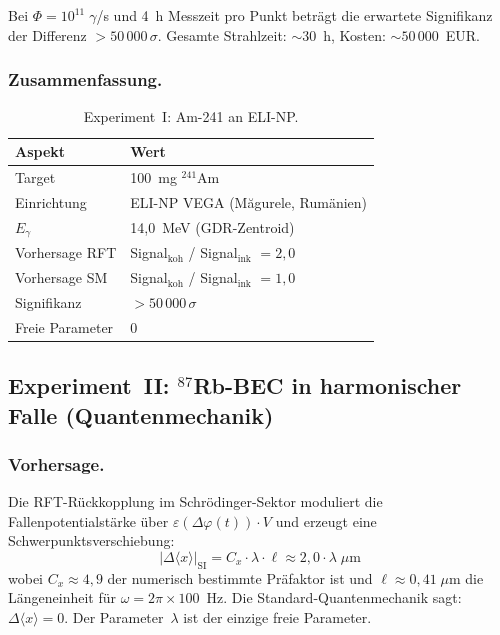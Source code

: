 \documentclass[12pt]{iopart}
\begin{document}
	Bei $\Phi = 10^{11}\;\gamma$/s und 4~h Messzeit pro Punkt
	betr\"agt die erwartete Signifikanz der Differenz
	$> 50\,000\,\sigma$. Gesamte Strahlzeit: ${\sim}30$~h,
	Kosten: ${\sim}50\,000$~EUR.
	
	\subsubsection{Zusammenfassung.}
	
	\begin{table}[ht]
		\centering
		\caption{Experiment~I: Am-241 an ELI-NP.}
		\label{tab:exp_am241}
		\begin{tabular}{ll}
			\hline
			\textbf{Aspekt} & \textbf{Wert} \\
			\hline
			Target & 100~mg ${}^{241}$Am \\
			Einrichtung & ELI-NP VEGA
			(M\u{a}gurele, Rum\"anien) \\
			$E_\gamma$ & 14{,}0~MeV (GDR-Zentroid) \\
			Vorhersage RFT & Signal$_{\mathrm{koh}}$ /
			Signal$_{\mathrm{ink}}$ $= 2{,}0$ \\
			Vorhersage SM & Signal$_{\mathrm{koh}}$ /
			Signal$_{\mathrm{ink}}$ $= 1{,}0$ \\
			Signifikanz & $> 50\,000\,\sigma$ \\
			Freie Parameter & $0$ \\
			\hline
		\end{tabular}
	\end{table}
	
	\subsection{Experiment~II: ${}^{87}$Rb-BEC in harmonischer
		Falle (Quantenmechanik)}
	\label{sec:exp_rb87}
	
	\subsubsection{Vorhersage.}
	
	Die RFT-R\"uckkopplung im Schr\"odinger-Sektor moduliert
	die Fallenpotentialst\"arke \"uber
	$\varepsilon(\Delta\varphi(t)) \cdot V$ und erzeugt eine
	Schwerpunktsverschiebung:
	\begin{equation}
		|\Delta\langle x\rangle|_{\mathrm{SI}}
		= C_x \cdot \lambda \cdot \ell
		\approx 2{,}0 \cdot \lambda\;\mu\mathrm{m}
		\label{eq:dx_rft}
	\end{equation}
	wobei $C_x \approx 4{,}9$ der numerisch bestimmte
	Pr\"afaktor ist und $\ell \approx 0{,}41\;\mu$m die
	L\"angeneinheit f\"ur $\omega = 2\pi \times 100$~Hz.
	Die Standard-Quantenmechanik sagt:
	$\Delta\langle x\rangle = 0$. Der Parameter~$\lambda$
	ist der einzige freie Parameter.
	
\end{document}

